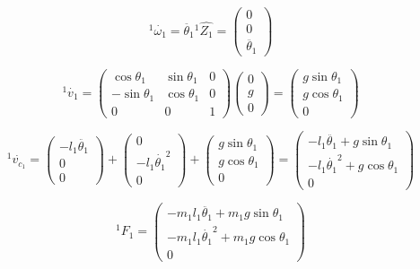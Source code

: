 \documentclass{homework}
\begin{document}
\begin{sol}
\[
  {^1}\dot{\omega_1} = \ddot{\theta_1} {^1}\hat{Z_1} = 
  \begin{pmatrix}
    0 \\
    0 \\
    \ddot{\theta_1} 
  \end{pmatrix}
\]

\[
  {^1}\dot{v_1} = 
  \begin{pmatrix}
    \cos\theta_1 & \sin\theta_1 & 0 \\
    -\sin\theta_1 & \cos\theta_1 & 0 \\
    0 & 0 & 1
  \end{pmatrix}
  \begin{pmatrix}
    0 \\
    g \\
    0
  \end{pmatrix} =
  \begin{pmatrix}
    g \sin\theta_1 \\
    g \cos\theta_1 \\
    0 
  \end{pmatrix}
\]

\[
  {^1}\dot{v_{c_1}} = 
  \begin{pmatrix}
    -l_1 \ddot{\theta_1} \\
    0 \\
    0 
  \end{pmatrix} +
  \begin{pmatrix}
    0 \\
    -l_1 \dot{\theta_1}^2 \\
    0 
  \end{pmatrix} +
  \begin{pmatrix}
    g \sin\theta_1 \\
    g \cos\theta_1 \\
    0 
  \end{pmatrix} =
  \begin{pmatrix}
    -l_1 \ddot{\theta_1} + g \sin\theta_1 \\
    -l_1 \dot{\theta_1}^2 + g \cos\theta_1 \\
    0 
  \end{pmatrix}
\]

\[
  {^1}F_1 = 
  \begin{pmatrix}
    -m_1 l_1 \ddot{\theta_1} + m_1 g \sin\theta_1 \\
    -m_1 l_1 \dot{\theta_1}^2 + m_1 g \cos\theta_1 \\
    0 
  \end{pmatrix}
\]


\end{sol}
\end{document}
